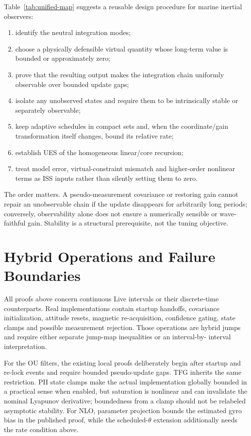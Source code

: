 \documentclass[conference]{IEEEtran}
\theoremstyle{remark}
\begin{document}
Table~\ref{tab:unified-map} suggests a reusable design procedure for marine
inertial observers:
\begin{enumerate}
 \item identify the neutral integration modes;
 \item choose a physically defensible virtual quantity whose long-term value is
       bounded or approximately zero;
 \item prove that the resulting output makes the integration chain uniformly
       observable over bounded update gaps;
 \item isolate any unobserved states and require them to be intrinsically stable
       or separately observable;
 \item keep adaptive schedules in compact sets and, when the coordinate/gain
       transformation itself changes, bound its relative rate;
 \item establish UES of the homogeneous linear/core recursion;
 \item treat model error, virtual-constraint mismatch and higher-order nonlinear
       terms as ISS inputs rather than silently setting them to zero.
\end{enumerate}

The order matters.  A pseudo-measurement covariance or restoring gain cannot
repair an unobservable chain if the update disappears for arbitrarily long
periods; conversely, observability alone does not ensure a numerically sensible
or wave-faithful gain.  Stability is a structural prerequisite, not the tuning
objective.

\section{Hybrid Operations and Failure Boundaries}

All proofs above concern continuous Live intervals or their discrete-time
counterparts.  Real implementations contain startup handoffs, covariance
initialization, attitude resets, magnetic re-acquisition, confidence gating,
state clamps and possible measurement rejection.  Those operations are hybrid
jumps and require either separate jump-map inequalities or an interval-by-
interval interpretation.

For the OU filters, the existing local proofs deliberately begin after startup
and re-lock events and require bounded pseudo-update gaps.  TFG inherits the
same restriction.  PII state clamps make the actual implementation globally
bounded in a practical sense when enabled, but saturation is nonlinear and can
invalidate the nominal Lyapunov derivative; boundedness from a clamp should not
be relabeled asymptotic stability.  For NLO, parameter projection bounds the
estimated gyro bias in the published proof, while the scheduled-$\theta$
extension additionally needs the rate condition above.
\end{document}
